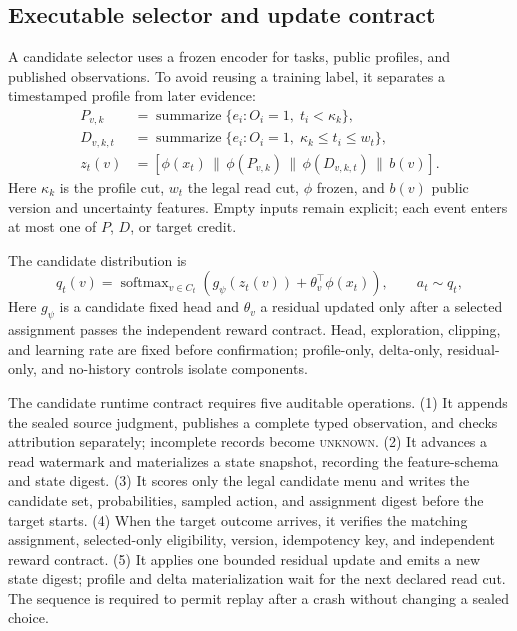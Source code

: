 \documentclass[sigconf,anonymous]{aamas}
\newcommand{\unknown}{\textsc{unknown}}
\begin{document}
\subsection{Executable selector and update contract}
A candidate selector uses a frozen encoder for tasks, public profiles, and published observations. To avoid reusing a training label, it separates a timestamped profile from later evidence:
\begin{align}
 P_{v,k}&=\operatorname{summarize}\{e_i:O_i=1,\;t_i<\kappa_k\},\\
 D_{v,k,t}&=\operatorname{summarize}\{e_i:O_i=1,\;\kappa_k\leq t_i\leq w_t\},\\
 z_t(v)&=[\phi(x_t)\,\|\,\phi(P_{v,k})\,\|\,\phi(D_{v,k,t})\,\|\,b(v)] .
 \label{eq:selector-state}
\end{align}
Here $\kappa_k$ is the profile cut, $w_t$ the legal read cut, $\phi$ frozen, and $b(v)$ public version and uncertainty features. Empty inputs remain explicit; each event enters at most one of $P$, $D$, or target credit.

The candidate distribution is
\begin{equation}
 q_t(v)=\operatorname{softmax}_{v\in C_t}\left(g_\psi(z_t(v))+\theta_v^\top\phi(x_t)\right),
 \qquad a_t\sim q_t,
 \label{eq:selector}
\end{equation}
Here $g_\psi$ is a candidate fixed head and $\theta_v$ a residual updated only after a selected assignment passes the independent reward contract. Head, exploration, clipping, and learning rate are fixed before confirmation; profile-only, delta-only, residual-only, and no-history controls isolate components.

The candidate runtime contract requires five auditable operations. (1) It appends the sealed source judgment, publishes a complete typed observation, and checks attribution separately; incomplete records become \unknown{}. (2) It advances a read watermark and materializes a state snapshot, recording the feature-schema and state digest. (3) It scores only the legal candidate menu and writes the candidate set, probabilities, sampled action, and assignment digest before the target starts. (4) When the target outcome arrives, it verifies the matching assignment, selected-only eligibility, version, idempotency key, and independent reward contract. (5) It applies one bounded residual update and emits a new state digest; profile and delta materialization wait for the next declared read cut. The sequence is required to permit replay after a crash without changing a sealed choice.
\end{document}
